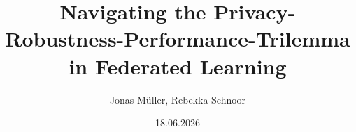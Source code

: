 \documentclass[t,aspectratio=169]{beamer}
\begin{document}
\title{Navigating the
Privacy-Robustness-Performance-Trilemma
in Federated Learning}
\author[]{Jonas Müller, Rebekka Schnoor}
\date{18.06.2026} %



\begin{frame}
    \maketitle
\end{frame}
\end{document}
